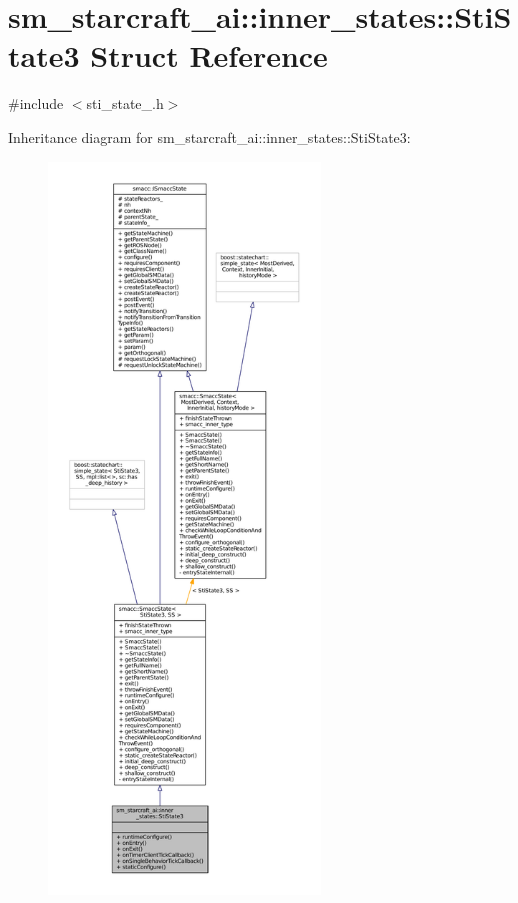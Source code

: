 \hypertarget{structsm__starcraft__ai_1_1inner__states_1_1StiState3}{}\section{sm\+\_\+starcraft\+\_\+ai\+:\+:inner\+\_\+states\+:\+:Sti\+State3 Struct Reference}
\label{structsm__starcraft__ai_1_1inner__states_1_1StiState3}


{\ttfamily \#include $<$sti\+\_\+state\+\_.\+h$>$}



Inheritance diagram for sm\+\_\+starcraft\+\_\+ai\+:\+:inner\+\_\+states\+:\+:Sti\+State3\+:
\nopagebreak
\begin{figure}[H]
\begin{center}
\leavevmode
\includegraphics[height=550pt]{structsm__starcraft__ai_1_1inner__states_1_1StiState3__inherit__graph}
\end{center}
\end{figure}


